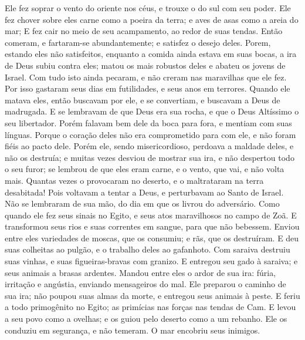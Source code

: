 {  Ele fez soprar o vento do oriente nos céus, e trouxe o
{} do sul com seu poder.
  Ele fez chover sobre eles carne como a poeira da terra; e aves de asas como a areia do mar;
  E
{} fez cair no meio de seu acampamento, ao redor de suas tendas.
  Então comeram, e fartaram-se abundantemente; e satisfez o desejo deles.
  Porem, estando eles
{} não satisfeitos, enquanto a comida ainda estava em suas bocas,
  a ira de Deus subiu contra eles; matou os mais robustos deles e abateu os jovens de Israel.
  Com tudo isto ainda pecaram, e não creram nas maravilhas que ele fez.
  Por isso gastaram seus dias em futilidades, e seus anos em terrores.
  Quando ele matava
{} eles, então buscavam por ele, e se convertiam, e buscavam a Deus de madrugada.
  E se lembravam de que Deus era sua rocha, e que o Deus Altíssimo
{} o seu libertador.
  Porém falavam bem dele da boca para fora, e mentiam com suas línguas.
  Porque o coração deles não era comprometido para com ele, e não foram fiéis ao pacto dele.
  Porém ele, sendo misericordioso, perdoava a maldade deles, e não os destruía; e muitas vezes desviou de mostrar sua ira, e não despertou todo o seu furor;
   se lembrou de que eles eram carne, e
{} o vento, que vai, e não volta mais.
  Quantas vezes o provocaram no deserto, e o maltrataram na terra desabitada!
  Pois voltavam a tentar a Deus, e perturbavam ao Santo de Israel.
  Não se lembraram de sua mão,
{} do dia em que os livrou do adversário.
  Como quando ele fez seus sinais no Egito, e seus atos maravilhosos no campo de Zoã.
  E transformou seus rios e suas correntes em sangue, para que não bebessem.
  Enviou entre eles variedades de moscas, que os consumiu; e rãs, que os destruíram.
  E deu suas colheitas ao pulgão, e o trabalho deles ao gafanhoto.
  Com saraiva destruiu suas vinhas, e suas figueiras-bravas com granizo.
  E entregou seu gado à saraiva; e seus animais a brasas ardentes.
  Mandou entre eles o ardor de sua ira: fúria, irritação e angústia, enviando mensageiros do mal.
  Ele preparou o caminho de sua ira; não poupou suas almas da morte, e entregou seus animais à peste.
  E feriu
{} a todo primogênito no Egito; as primícias nas forças nas tendas de Cam.
  E levou a seu povo como a ovelhas; e os guiou pelo deserto como a um rebanho.
  Ele os conduziu em segurança, e não temeram. O mar encobriu seus inimigos.
}

